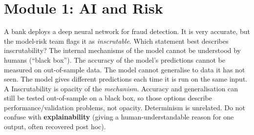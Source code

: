 \section{Module 1: AI and Risk}

{A bank deploys a deep neural network for fraud detection. It is very accurate, but the model-risk team flags it as \emph{inscrutable}. Which statement best describes inscrutability?}
{The internal mechanisms of the model cannot be understood by humans (``black box'').}
{The accuracy of the model's predictions cannot be measured on out-of-sample data.}
{The model cannot generalise to data it has not seen.}
{The model gives different predictions each time it is run on the same input.}
{A}
{Inscrutability is opacity of the \emph{mechanism}. Accuracy and generalisation can still be tested out-of-sample on a black box, so those options describe performance/validation problems, not opacity. Determinism is unrelated. Do not confuse with \textbf{explainability} (giving a human-understandable reason for one output, often recovered post hoc).}

